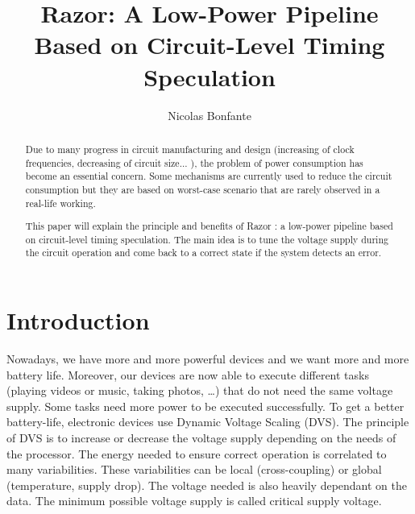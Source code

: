 \documentclass[fleqn,envcountsame,runningheads,10pt,a4paper]{llncs}
\begin{document}
\title{Razor: A Low-Power Pipeline Based on Circuit-Level Timing Speculation}
\author{Nicolas Bonfante}

\maketitle

\begin{abstract}
Due to many progress in circuit manufacturing and design (increasing of
	clock frequencies, decreasing of circuit size... ), the problem of
	power consumption has become an essential concern. Some mechanisms
	are currently used to reduce the circuit consumption but they are
	based on worst-case scenario that are rarely observed in a real-life working. 

This paper will explain the principle and benefits of Razor : a low-power pipeline based on circuit-level timing speculation. The main idea is to tune the voltage supply during the circuit operation and come back to a correct state if the system detects an error.
\end{abstract}


\section{Introduction}
Nowadays, we have more and more powerful devices and we want more and
more battery life. Moreover, our devices are now able to execute
different tasks (playing videos or music, taking photos, \dots) that do
not need the same voltage supply. Some tasks need more power to be
executed successfully. To get a better battery-life, electronic devices
use Dynamic Voltage Scaling (DVS)\cite{Pering:1998}. The principle of
DVS is to increase or decrease the voltage supply depending on the needs
of the processor. The energy needed to ensure correct operation is
correlated to many variabilities. These variabilities can be local
(cross-coupling) or global (temperature, supply drop). The voltage
needed is also heavily dependant on the data. The minimum possible
voltage supply is called critical supply voltage. %
\end{document}
